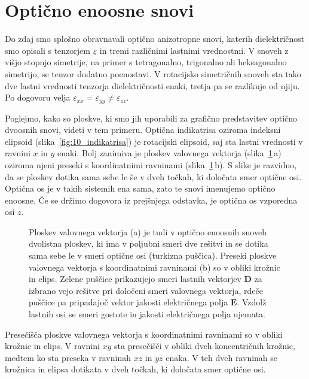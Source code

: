 \section{Optično enoosne snovi}
Do zdaj smo splošno obravnavali optično anizotropne snovi, katerih dielektričnost
smo opisali s tenzorjem $\underline{\varepsilon}$ in tremi različnimi lastnimi vrednostmi. 
V snoveh z višjo stopnjo simetrije, na primer s tetragonalno, trigonalno ali heksagonalno
simetrijo, se tenzor dodatno poenostavi. V rotacijsko simetričnih snoveh sta tako dve lastni 
vrednosti tenzorja dielektričnosti enaki, tretja pa se razlikuje od njiju.
Po dogovoru velja $\varepsilon_{xx} = \varepsilon_{yy}\neq \varepsilon_{zz}$.

Poglejmo, kako so ploskve, ki smo jih uporabili za grafično predstavitev optično
dvoosnih snovi, videti v tem primeru. Optična indikatrisa oziroma indeksni elipsoid 
(slika~\ref{fig:10_indikatrisa}) je rotacijski elipsoid, saj sta lastni vrednosti
v ravnini $x$ in $y$ enaki. Bolj zanimiva je ploskev valovnega vektorja 
(slika~\ref{fig:10_ploskev_3D_eno}\,a)
oziroma njeni preseki s koordinatnimi ravninami (slika~\ref{fig:10_ploskev_3D_eno}\,b). 
S slike je razvidno, da se ploskev dotika sama sebe le še v dveh točkah, ki določata 
smer optične osi. Optična os je v takih sistemih ena sama, zato te snovi imenujemo optično 
enoosne. Če se držimo dogovora iz prejšnjega odstavka, je optična os vzporedna osi $z$.
\begin{figure}[h]
\centering
\def\svgwidth{130truemm} 

\caption{Ploskev valovnega vektorja (a) je tudi v optično enoosnih snoveh dvolistna ploskev, 
ki ima v poljubni smeri dve rešitvi in se dotika sama sebe le v smeri optične osi 
(turkizna puščica). Preseki ploskve valovnega vektorja
s koordinatnimi ravninami (b) so v obliki krožnic in elips.
Zelene puščice prikazujejo smeri lastnih vektorjev $\mathbf{D}$ za izbrano vejo rešitve pri 
določeni smeri valovnega vektorja, rdeče puščice pa pripadajoč vektor jakosti električnega polja 
$\mathbf{E}$. Vzdolž lastnih osi se smeri gostote in jakosti električnega polja ujemata.}
\label{fig:10_ploskev_3D_eno}
\end{figure}

Presečišča ploskve valovnega vektorja s koordinatnimi ravninami so v obliki krožnic
in elips. V ravnini $xy$ sta presečišči v obliki dveh koncentričnih krožnic, medtem ko sta 
preseka v ravninah $xz$ in $yz$ enaka. V teh dveh ravninah
se krožnica in elipsa dotikata v dveh točkah, ki določata smer optične osi.

